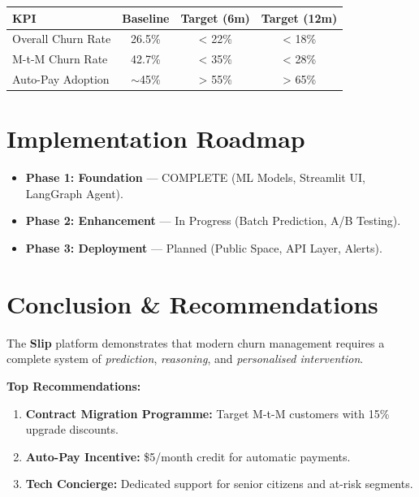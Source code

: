 \documentclass[11pt,a4paper]{article}
\begin{document}
\begin{table}[h!]
\centering
\begin{tabularx}{\textwidth}{l c c c}
\toprule
\textbf{KPI} & \textbf{Baseline} & \textbf{Target (6m)} & \textbf{Target (12m)} \\
\midrule
Overall Churn Rate & 26.5\% & < 22\% & < 18\% \\
M-t-M Churn Rate & 42.7\% & < 35\% & < 28\% \\
Auto-Pay Adoption & $\sim$45\% & > 55\% & > 65\% \\
\bottomrule
\end{tabularx}
\end{table}

\section{Implementation Roadmap}

\begin{itemize}
    \item[\checkmark] \textbf{Phase 1: Foundation} — COMPLETE (ML Models, Streamlit UI, LangGraph Agent).
    \item[$\square$] \textbf{Phase 2: Enhancement} — In Progress (Batch Prediction, A/B Testing).
    \item[$\square$] \textbf{Phase 3: Deployment} — Planned (Public Space, API Layer, Alerts).
\end{itemize}

\section{Conclusion \& Recommendations}

The \textbf{Slip} platform demonstrates that modern churn management requires a complete system of \textit{prediction}, \textit{reasoning}, and \textit{personalised intervention}.

\textbf{Top Recommendations:}
\begin{enumerate}
    \item \textbf{Contract Migration Programme:} Target M-t-M customers with 15\% upgrade discounts.
    \item \textbf{Auto-Pay Incentive:} \$5/month credit for automatic payments.
    \item \textbf{Tech Concierge:} Dedicated support for senior citizens and at-risk segments.
\end{enumerate}
\end{document}
